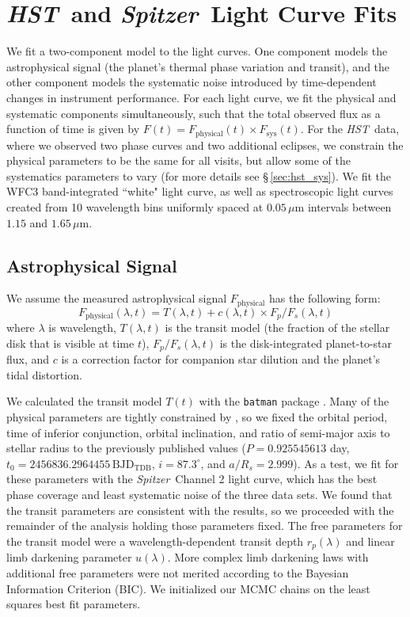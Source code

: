 \documentclass[twocolumn, trackchanges]{aastex61}
\newcommand{\project}[1]{\textsl{#1}}
\newcommand{\HST}{\project{HST}}
\newcommand{\Spitzer}{\project{Spitzer}}
\begin{document}
\section{\HST\ and \Spitzer\ Light Curve Fits}
\label{sec:fits}
We fit a two-component model to the light curves. One component models the astrophysical signal (the planet's thermal phase variation and transit), and the other component models the systematic noise introduced by time-dependent changes in instrument performance. For each light curve, we fit the physical and systematic components simultaneously, such that the total observed flux as a function of time is given by $F(t) = F_\mathrm{physical}(t) \times F_\mathrm{sys}(t)$. For the \HST\ data, where we observed two phase curves and two additional eclipses, we constrain the physical parameters to be the same for all visits, but allow some of the systematics parameters to vary (for more details see \S\,\ref{sec:hst_sys}). We fit the WFC3 band-integrated ``white" light curve, as well as spectroscopic light curves created from 10 wavelength bins uniformly spaced at $0.05\,\mu$m intervals between $1.15$ and $1.65\,\mu$m.

\subsection{Astrophysical Signal}
We assume the measured astrophysical signal $F_\mathrm{physical}$ has the following form:
\begin{equation}
	F_\mathrm{physical}(\lambda, t) =  T(\lambda, t) + c(\lambda, t) \times F_p/F_s(\lambda, t)
\end{equation}
where $\lambda$ is wavelength, $T(\lambda, t)$ is the transit model (the fraction of the stellar disk that is visible at time $t$), $F_p/F_s(\lambda, t)$ is the disk-integrated planet-to-star flux, and $c$ is a correction factor for companion star dilution and the planet's tidal distortion. 

We calculated the transit model $T(t)$ with the \texttt{batman} package \citep{kreidberg15a}. Many of the physical parameters are tightly constrained by \cite{southworth15}, so we fixed the orbital period, time of inferior conjunction, orbital inclination, and ratio of semi-major axis to stellar radius to the previously published values ($P = 0.925545613$ day, $t_0 = 2456836.2964455\,\mathrm{BJD_{TDB}}$, $i = 87.3^\circ$, and $a/R_s = 2.999$). As a test, we fit for these parameters with the \Spitzer\ Channel 2 light curve, which has the best phase coverage and least systematic noise of the three data sets. We found that the transit parameters are consistent with the \cite{southworth15} results, so we proceeded with the remainder of the analysis holding those parameters fixed.  The free parameters for the transit model were a wavelength-dependent transit depth $r_p(\lambda)$ and linear limb darkening parameter $u(\lambda)$. More complex limb darkening laws with additional free parameters were not merited according to the Bayesian Information Criterion (BIC). We initialized our MCMC chains on the least squares best fit parameters.
\end{document}
